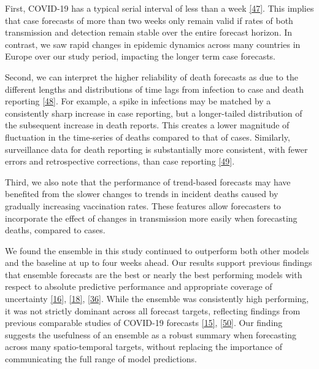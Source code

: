 \documentclass[
]{article}
\begin{document}
First, COVID-19 has a typical serial interval of less than a week \protect\hyperlink{ref-aleneSerialIntervalIncubation2021}{{[}47{]}}. This implies that case forecasts of more than two weeks only remain valid if rates of both transmission and detection remain stable over the entire forecast horizon. In contrast, we saw rapid changes in epidemic dynamics across many countries in Europe over our study period, impacting the longer term case forecasts.

Second, we can interpret the higher reliability of death forecasts as due to the different lengths and distributions of time lags from infection to case and death reporting \protect\hyperlink{ref-jinLagDailyReported2021}{{[}48{]}}. For example, a spike in infections may be matched by a consistently sharp increase in case reporting, but a longer-tailed distribution of the subsequent increase in death reports. This creates a lower magnitude of fluctuation in the time-series of deaths compared to that of cases. Similarly, surveillance data for death reporting is substantially more consistent, with fewer errors and retrospective corrections, than case reporting \protect\hyperlink{ref-catalaRobustEstimationDiagnostic2021}{{[}49{]}}.

Third, we also note that the performance of trend-based forecasts may have benefited from the slower changes to trends in incident deaths caused by gradually increasing vaccination rates. These features allow forecasters to incorporate the effect of changes in transmission more easily when forecasting deaths, compared to cases.

We found the ensemble in this study continued to outperform both other models and the baseline at up to four weeks ahead. Our results support previous findings that ensemble forecasts are the best or nearly the best performing models with respect to absolute predictive performance and appropriate coverage of uncertainty \protect\hyperlink{ref-funkShorttermForecastsInform2020}{{[}16{]}}, \protect\hyperlink{ref-viboudRAPIDDEbolaForecasting2018}{{[}18{]}}, \protect\hyperlink{ref-cramerEvaluationIndividualEnsemble2021}{{[}36{]}}. While the ensemble was consistently high performing, it was not strictly dominant across all forecast targets, reflecting findings from previous comparable studies of COVID-19 forecasts \protect\hyperlink{ref-bracherPreregisteredShorttermForecasting2021}{{[}15{]}}, \protect\hyperlink{ref-brooksComparingEnsembleApproaches2020}{{[}50{]}}. Our finding suggests the usefulness of an ensemble as a robust summary when forecasting across many spatio-temporal targets, without replacing the importance of communicating the full range of model predictions.
\end{document}
